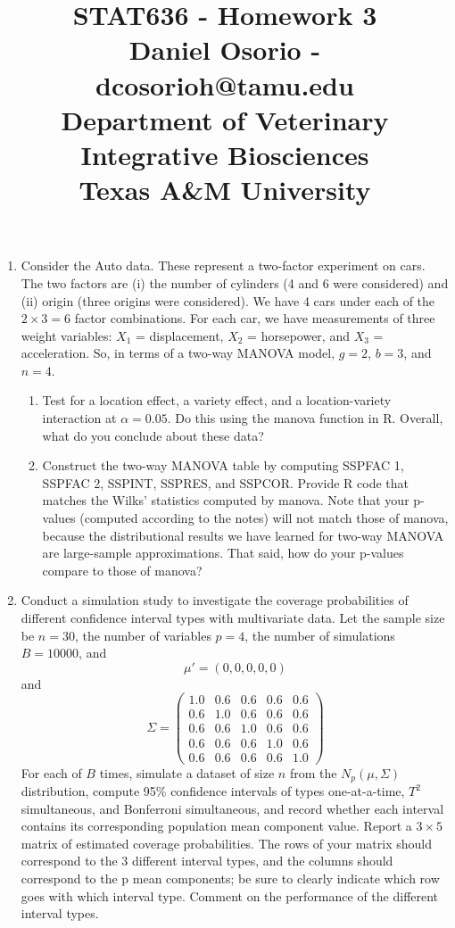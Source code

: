 \documentclass[12pt,a4paper]{paper}
\begin{document}
\title{STAT636 - Homework 3\\\small{Daniel Osorio - dcosorioh@tamu.edu\\Department of Veterinary Integrative Biosciences\\Texas A\&M University}}
\maketitle

\begin{enumerate}
\item Consider the Auto data. These represent a two-factor experiment on cars. The two factors are (i) the number of cylinders (4 and 6 were considered) and (ii) origin (three origins were considered). We have 4 cars under each of the $2 \times 3 = 6$ factor combinations. For each car, we have measurements of three weight variables: $X_{1}$ = displacement, $X_{2}$ = horsepower, and $X_{3}$ = acceleration. So, in terms of a two-way MANOVA model, $g = 2$, $b = 3$, and $n = 4$.
\begin{enumerate}
\item Test for a location effect, a variety effect, and a location-variety interaction at $\alpha = 0.05$. Do this using the manova function in R. Overall, what do you conclude about these data?
\item Construct the two-way MANOVA table by computing SSPFAC 1, SSPFAC 2, SSPINT, SSPRES, and SSPCOR. Provide R code that matches the Wilks’ statistics computed by manova. Note that your p-values (computed according to the notes) will not match those of manova, because the distributional results we have learned for two-way MANOVA are large-sample approximations. That said, how do your p-values compare to those of manova?
\end{enumerate}
\item Conduct a simulation study to investigate the coverage probabilities of different confidence
interval types with multivariate data. Let the sample size be $n = 30$, the number of variables $p = 4$, the number of simulations $B = 10000$, and \[\mu' =\left(0, 0, 0, 0, 0\right)\] and \[\Sigma = \left(\begin{array}{ccccc}1.0&0.6&0.6&0.6&0.6\\0.6&1.0&0.6&0.6&0.6\\0.6&0.6&1.0&0.6&0.6\\0.6&0.6&0.6&1.0&0.6\\0.6&0.6&0.6&0.6&1.0\end{array}\right)\] For each of $B$ times, simulate a dataset of size $n$ from the $N_{p}\left(\mu,\Sigma\right)$ distribution, compute 95\% confidence intervals of types one-at-a-time, $T^{2}$ simultaneous, and Bonferroni simultaneous, and record whether each interval contains its corresponding population mean component value. Report a $3 \times 5$ matrix of estimated coverage probabilities. The rows of your matrix should correspond to the 3 different interval types, and the columns should correspond to the p mean components; be sure to clearly indicate which row goes with which interval type. Comment on the performance of the different interval types.
\end{enumerate}
\end{document}
